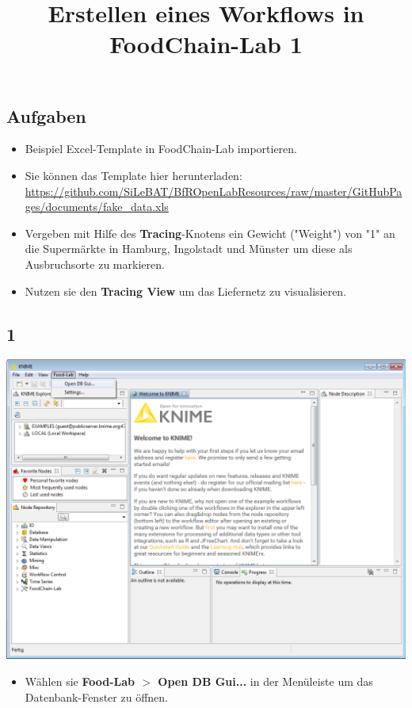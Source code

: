 \documentclass{beamer}
\title{Erstellen eines Workflows in FoodChain-Lab 1}
\date{}
\begin{document}
\maketitle

\section{ }

\subsection{Aufgaben}
\begin{frame}
	\begin{itemize}
		\item Beispiel Excel-Template in FoodChain-Lab importieren.
		\item Sie können das Template hier herunterladen: \url{https://github.com/SiLeBAT/BfROpenLabResources/raw/master/GitHubPages/documents/fake_data.xls}
		\item Vergeben mit Hilfe des \textbf{Tracing}-Knotens ein Gewicht ("Weight") von "1" an die Supermärkte in Hamburg, Ingolstadt und Münster um diese als Ausbruchsorte zu markieren.
		\item Nutzen sie den \textbf{Tracing View} um das Liefernetz zu visualisieren.
	\end{itemize}
\end{frame}
 
\subsection{1}
\begin{frame}
	\begin{center}
  		\includegraphics[height=0.6\textheight]{1.png}
	\end{center}
	\begin{itemize}
		\item Wählen sie \textbf{Food-Lab $>$ Open DB Gui...} in der Menüleiste um das Datenbank-Fenster zu öffnen.
	\end{itemize}
\end{frame}
\end{document}
